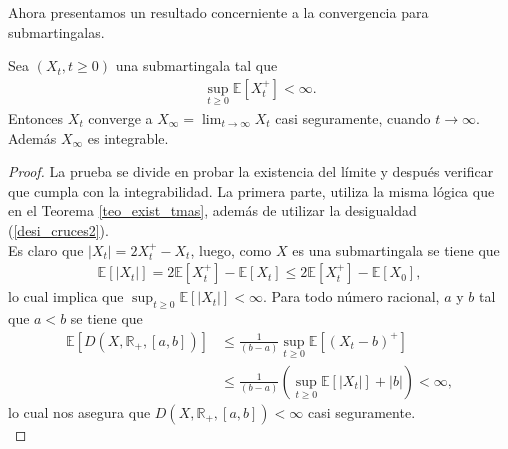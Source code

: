 Ahora presentamos un resultado concerniente a la convergencia para submartingalas.

\begin{theorem}
Sea $(X_t, t \geq 0)$ una submartingala tal que
\begin{align*}
\sup_{t \geq 0} \mathbb{E}[X_t^{+}] < \infty.
\end{align*}
Entonces $X_t$ converge a $X_{\infty} = \lim_{t \rightarrow \infty} X_t$ casi seguramente, cuando $t \rightarrow \infty$. Además $X_{\infty}$ es integrable.
\end{theorem}
\begin{proof}
La prueba se divide en probar la existencia del límite y después verificar que cumpla con la integrabilidad. La primera parte, utiliza la misma lógica que en el Teorema \ref{teo_exist_tmas}, además de utilizar la desigualdad (\ref{desi_cruces2}). \\

Es claro que $|X_t| = 2 X_t^{+} - X_t$, luego, como $X$ es una submartingala se tiene que
\begin{align*}
\mathbb{E}[|X_t|] = 2 \mathbb{E}[X_t^{+}] - \mathbb{E}[X_t] \leq 2 \mathbb{E}[X_t^{+}] - \mathbb{E}[X_0],
\end{align*}
lo cual implica que $\sup_{t \geq 0} \mathbb{E}[|X_t|] < \infty$. Para todo número racional, $a$ y $b$ tal que $a < b$ se tiene que 
\begin{align*}
\mathbb{E} \left[ D(X, \mathbb{R}_{+}, [a, b]) \right] & \leq \frac{1}{(b-a)} \sup_{t \geq 0} \mathbb{E} \left[ (X_t - b)^{+} \right] \\
& \leq \frac{1}{(b-a)} \left( \sup_{t \geq 0} \mathbb{E} \left[ |X_t| \right] + |b| \right) < \infty,
\end{align*}
lo cual nos asegura que $D(X, \mathbb{R}_{+}, [a, b]) < \infty$ casi seguramente. \\


\end{proof}
